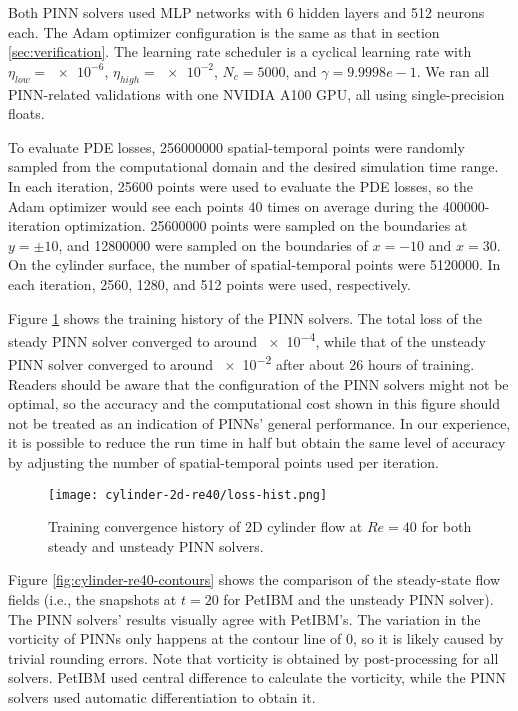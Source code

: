 Both PINN solvers used MLP networks with \num{6} hidden layers and \num{512} neurons each.
The Adam optimizer configuration is the same as that in section \ref{sec:verification}.
The learning rate scheduler is a cyclical learning rate with $\eta_{low}=\num{e-6}$, $\eta_{high}=\num{e-2}$, $N_c=\num{5000}$, and $\gamma={9.9998e-1}$.
We ran all PINN-related validations with one NVIDIA A100 GPU,
all using single-precision floats.

To evaluate PDE losses, \num{256000000} spatial-temporal points were randomly sampled from the computational domain and the desired simulation time range.
In each iteration, \num{25600} points were used to evaluate the PDE losses, so the Adam optimizer would see each points \num{40} times on average during the \num{400000}-iteration optimization.
\num{25600000} points were sampled on the boundaries at $y=\pm 10$, and \num{12800000} were sampled on the boundaries of $x=-10$ and $x=30$.
On the cylinder surface, the number of spatial-temporal points were \num{5120000}.
In each iteration, \num{2560}, \num{1280}, and \num{512} points were used, respectively.

Figure \ref{fig:cylinder-re40-pinn-loss} shows the training history of the PINN solvers.
The total loss of the steady PINN solver converged to around \num{e-4}, while that of the unsteady PINN solver converged to around \num{e-2} after about 26 hours of training.
Readers should be aware that the configuration of the PINN solvers might not be optimal, so the accuracy and the computational cost shown in this figure should not be treated as an indication of PINNs' general performance.
In our experience, it is possible to reduce the run time in half but obtain the same level of accuracy by adjusting the number of spatial-temporal points used per iteration.

\begin{figure}
    \centering%
    \texttt{[image: cylinder-2d-re40/loss-hist.png]}%
    \caption{%
        Training convergence history of 2D cylinder flow at $Re=\num{40}$ for both steady and unsteady PINN solvers.
    }
    \label{fig:cylinder-re40-pinn-loss}%
\end{figure}

Figure \ref{fig:cylinder-re40-contours} shows the comparison of the steady-state flow fields (i.e., the snapshots at $t=20$ for PetIBM and the unsteady PINN solver).
The PINN solvers' results visually agree with PetIBM's.
The variation in the vorticity of PINNs only happens at the contour line of \num{0}, so it is likely caused by trivial rounding errors.
Note that vorticity is obtained by post-processing for all solvers.
PetIBM used central difference to calculate the vorticity, while the PINN solvers used automatic differentiation to obtain it.

